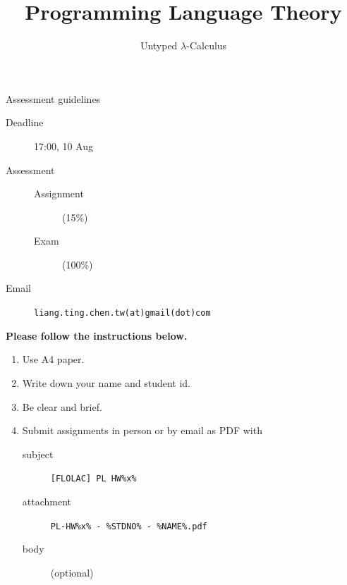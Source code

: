 \title{Programming Language Theory}
\subtitle{Untyped $\lambda$-Calculus}


{
\begin{frame}\maketitle\end{frame}}

\begin{frame}[fragile]{Assessment guidelines}
  \begin{description}
    \item[Deadline] 17:00, 10 Aug
    \item[Assessment] 
      \begin{description}
        \item[Assignment] (15\%)
        \item[Exam] (100\%)
      \end{description}
    \item[Email] \texttt{liang.ting.chen.tw(at)gmail(dot)com}
  \end{description}

  \textbf{Please follow the instructions below.}

  \begin{enumerate}
    \item Use A4 paper.
    \item Write down your name and student id. 
    \item Be clear and brief.
    \item Submit assignments in person or by email as \alert{PDF} with 
      \begin{description}
        \item[subject] \texttt{[FLOLAC] PL HW\%x\%}
        \item[attachment] \texttt{PL-HW\%x\% - \%STDNO\% - \%NAME\%.pdf}
        \item[body] (optional)
      \end{description}
  \end{enumerate}
\end{frame}

